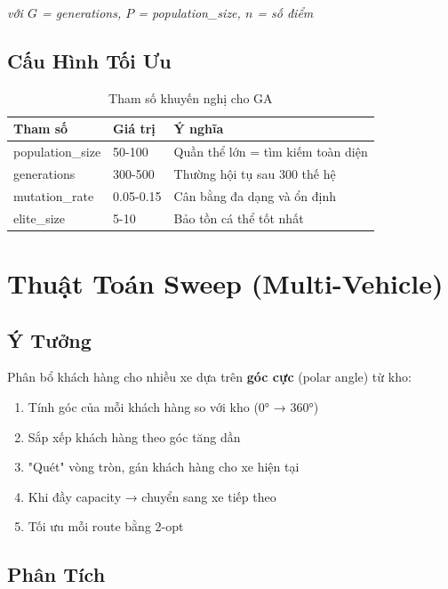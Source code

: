 \documentclass[12pt,a4paper,openany,oneside]{report}
\begin{document}
\textit{với $G$ = generations, $P$ = population\_size, $n$ = số điểm}

\subsection{Cấu Hình Tối Ưu}

\begin{table}[h]
\centering
\caption{Tham số khuyến nghị cho GA}
\begin{tabular}{@{}lll@{}}
\toprule
\textbf{Tham số} & \textbf{Giá trị} & \textbf{Ý nghĩa} \\
\midrule
population\_size & 50-100 & Quần thể lớn = tìm kiếm toàn diện \\
generations & 300-500 & Thường hội tụ sau 300 thế hệ \\
mutation\_rate & 0.05-0.15 & Cân bằng đa dạng và ổn định \\
elite\_size & 5-10 & Bảo tồn cá thể tốt nhất \\
\bottomrule
\end{tabular}
\end{table}

\section{Thuật Toán Sweep (Multi-Vehicle)}

\subsection{Ý Tưởng}

Phân bổ khách hàng cho nhiều xe dựa trên \textbf{góc cực} (polar angle) từ kho:

\begin{enumerate}
    \item Tính góc của mỗi khách hàng so với kho (0° → 360°)
    \item Sắp xếp khách hàng theo góc tăng dần
    \item "Quét" vòng tròn, gán khách hàng cho xe hiện tại
    \item Khi đầy capacity → chuyển sang xe tiếp theo
    \item Tối ưu mỗi route bằng 2-opt
\end{enumerate}

\subsection{Phân Tích}
\end{document}
